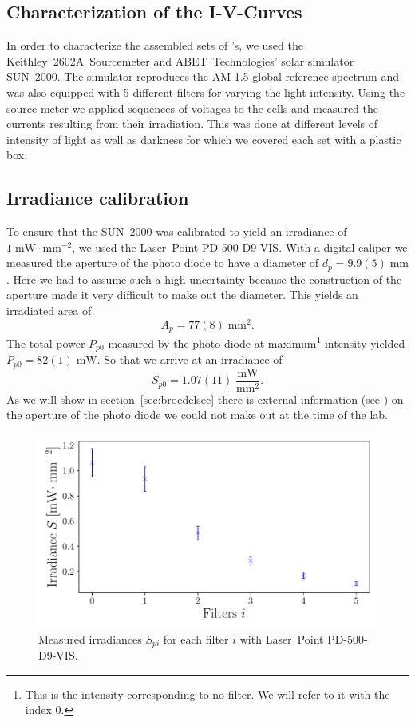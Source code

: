 \documentclass[a4paper,10pt,twocolumn]{article}
\begin{document}
\begin{extract*}

\section{Characterization of the I-V-Curves}\label{sec:charac}

In order to characterize the assembled sets of \BHSC's, we used the Keithley~2602A~Sourcemeter and ABET~Technologies’ solar simulator SUN~2000. The simulator reproduces the AM 1.5 global reference spectrum and was also equipped with 5 different filters for varying the light intensity. Using the source meter we applied sequences of voltages to the cells and measured the currents resulting from their irradiation. This was done at different levels of intensity of light as well as darkness for which we covered each set with a plastic box.
\subsection{Irradiance calibration}
To ensure that the SUN~2000 was calibrated to yield an irradiance of $1\;\text{mW}\!\cdot\text{mm}^{-2}$, we used the Laser~Point PD-500-D9-VIS. With a digital caliper we measured the aperture of the photo diode to have a diameter of $d_p = 9.9(5)\;\text{mm}$. Here we had to assume such a high uncertainty because the construction of the aperture made it very difficult to make out the diameter. This yields an irradiated area of
\begin{equation*}
	A_p =  77(8)\;\text{mm}^2.
\end{equation*}
The total power $P_{p0}$ measured by the photo diode at maximum\footnote{This is the intensity corresponding to no filter. We will refer to it with the index 0.} intensity yielded $P_{p0} = 82(1)\;\text{mW}$. So that we arrive at an irradiance of
\begin{equation*}
	S_{p0} = 1.07(11)\;\frac{\text{mW}}{\text{mm}^2}.
\end{equation*}
As we will show in section~\ref{sec:broedelsec} there is external information (see \cite{photodiode}) on the aperture of the photo diode we could not make out at the time of the lab.
\begin{figure}[h]
	\includegraphics[scale=0.5]{../2_Pictures/Photodiode_irradiance.pdf}
	\caption{Measured irradiances $S_{pi}$ for each filter $i$ with Laser~Point PD-500-D9-VIS.}
	\label{fig:photodiode_irradiances}
\end{figure}


\end{extract*}
\end{document}
